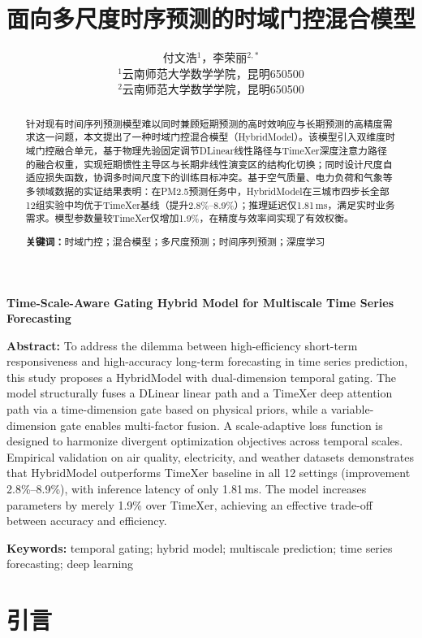 \documentclass[12pt,a4paper]{article}
\title{\textbf{面向多尺度时序预测的时域门控混合模型}}
\author{付文浩$^{1}$，李荣丽$^{2,*}$\\
\small $^{1}$云南师范大学数学学院，昆明650500\\
\small $^{2}$云南师范大学数学学院，昆明650500}
\date{}
\begin{document}
\maketitle

\begin{abstract}
针对现有时间序列预测模型难以同时兼顾短期预测的高时效响应与长期预测的高精度需求这一问题，本文提出了一种时域门控混合模型（HybridModel）。该模型引入双维度时域门控融合单元，基于物理先验固定调节DLinear线性路径与TimeXer深度注意力路径的融合权重，实现短期惯性主导区与长期非线性演变区的结构化切换；同时设计尺度自适应损失函数，协调多时间尺度下的训练目标冲突。基于空气质量、电力负荷和气象等多领域数据的实证结果表明：在PM2.5预测任务中，HybridModel在三城市四步长全部12组实验中均优于TimeXer基线（提升2.8\%--8.9\%）；推理延迟仅1.81\,ms，满足实时业务需求。模型参数量较TimeXer仅增加1.9\%，在精度与效率间实现了有效权衡。

\textbf{关键词：}时域门控；混合模型；多尺度预测；时间序列预测；深度学习
\end{abstract}

\begin{center}
\textbf{\large Time-Scale-Aware Gating Hybrid Model for Multiscale Time Series Forecasting}

\vspace{0.5em}
\noindent\textbf{Abstract:} To address the dilemma between high-efficiency short-term responsiveness and high-accuracy long-term forecasting in time series prediction, this study proposes a HybridModel with dual-dimension temporal gating. The model structurally fuses a DLinear linear path and a TimeXer deep attention path via a time-dimension gate based on physical priors, while a variable-dimension gate enables multi-factor fusion. A scale-adaptive loss function is designed to harmonize divergent optimization objectives across temporal scales. Empirical validation on air quality, electricity, and weather datasets demonstrates that HybridModel outperforms TimeXer baseline in all 12 settings (improvement 2.8\%--8.9\%), with inference latency of only 1.81\,ms. The model increases parameters by merely 1.9\% over TimeXer, achieving an effective trade-off between accuracy and efficiency.

\noindent\textbf{Keywords:} temporal gating; hybrid model; multiscale prediction; time series forecasting; deep learning
\end{center}

\section{引言}
\end{document}
